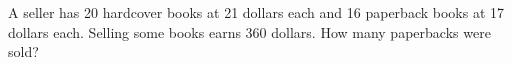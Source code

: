 A seller has 20 hardcover books at 21 dollars each and 16 paperback books at 17 dollars each. Selling some books earns 360 dollars. How many paperbacks were sold?
